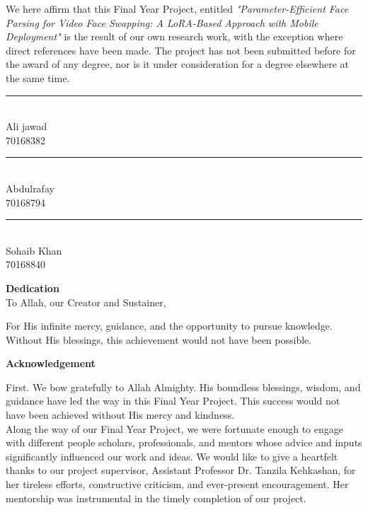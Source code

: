 \documentclass[12pt,a4paper]{report}
\begin{document}
\noindent We here affirm that this Final Year Project, entitled \textit{"Parameter-Efficient Face Parsing for Video Face Swapping: A LoRA-Based Approach with Mobile Deployment"} is the result of our own research work, with the exception where direct references have been made. The project has not been submitted before for the award of any degree, nor is it under consideration for a degree elsewhere at the same time.\\[2cm]
\begin{flushright}
\noindent\rule{5cm}{0.5pt}\\
Ali jawad\\
70168382\\[3cm]
\noindent\rule{5cm}{0.5pt}\\
Abdulrafay\\
70168794\\[3cm]
\noindent\rule{5cm}{0.5pt}\\
Sohaib Khan\\
70168840\\[3cm]
\end{flushright}
\newpage
\begin{center}
\vspace*{\fill}

\Large{\textbf{Dedication}}\\[1.5cm]

\large{To Allah, our Creator and Sustainer,}\\[0.5cm]

\begin{minipage}{0.9\textwidth}
\centering
For His infinite mercy, guidance, and the opportunity to pursue knowledge. Without His blessings, this achievement would not have been possible.
\end{minipage}

\vspace*{\fill}
\end{center}
\newpage
\begin{center}
\Large{\textbf{Acknowledgement}}\\[1.5cm]
\end{center}

\noindent First. We bow gratefully to Allah Almighty. His boundless blessings, wisdom, and guidance have led the way in this Final Year Project. This success would not have been achieved without His mercy and kindness.
\\

\noindent Along the way of our Final Year Project, we were fortunate enough to engage with different people scholars, professionals, and mentors whose advice and inputs significantly influenced our work and ideas. We would like to give a heartfelt thanks to our project supervisor, Assistant Professor Dr. Tanzila Kehkashan, for her tireless efforts, constructive criticism, and ever-present encouragement. Her mentorship was instrumental in the timely completion of our project.
\\
\end{document}
